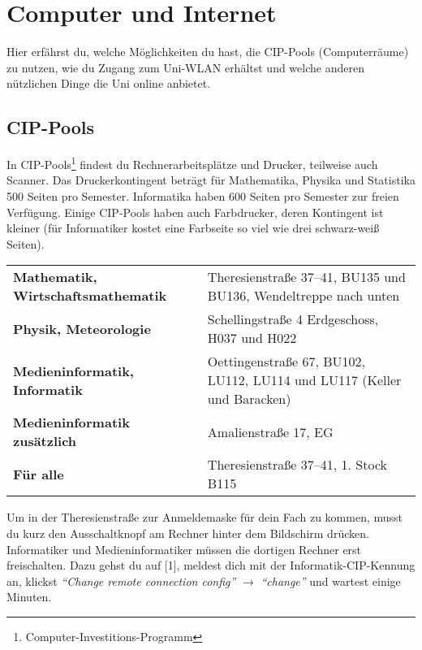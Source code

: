 
%
	
\chapter{Computer und Internet}
Hier erfährst du, welche Möglichkeiten du hast, die CIP-Pools (Computerräume) zu nutzen,  wie du Zugang zum Uni-WLAN erhältst 
und welche anderen nützlichen Dinge die Uni online anbietet.


\section{CIP-Pools}
In CIP-Pools\footnote{Computer-Investitions-Programm} findest du Rechnerarbeitsplätze und Drucker, teilweise auch Scanner. Das Druckerkontingent beträgt für Mathematika, Physika und Statistika 500 Seiten pro Semester. Informatika haben 600 Seiten pro Semester zur freien Verfügung. Einige CIP-Pools haben auch Farbdrucker, deren Kontingent ist kleiner (für Informatiker kostet eine Farbseite so viel wie drei schwarz-weiß Seiten).

\begin{tabularx}{\linewidth}{lX}
\textbf{Mathematik, Wirtschaftsmathematik}
& Theresienstraße 37--41, BU135 und BU136, Wendeltreppe nach unten\\
\textbf{Physik, Meteorologie}
& Schellingstraße 4 Erdgeschoss, H037 und H022\\
\textbf{Medieninformatik, Informatik}
& Oettingenstraße 67, BU102, LU112, LU114 und LU117 (Keller und Baracken)\\
\textbf{Medieninformatik zusätzlich}
& Amalienstraße 17, EG\\
\textbf{Für alle}
& Theresienstraße 37--41, 1. Stock B115 \newline
\end{tabularx}

Um in der Theresienstraße zur Anmeldemaske für dein Fach zu kommen, musst du kurz den Ausschaltknopf am Rechner hinter dem Bildschirm drücken. Informatiker und Medieninformatiker müssen die dortigen Rechner erst freischalten. Dazu gehst du auf [1], meldest dich mit der Informatik-CIP-Kennung an, klickst \emph{\enquote{Change remote connection config}} $\rightarrow$ \emph{\enquote{change}} und wartest einige Minuten.

